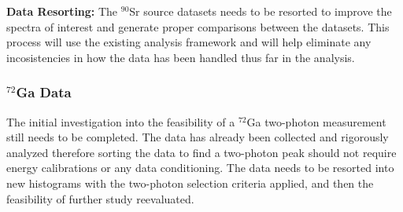 \documentclass[cnatzke_thesis_proposal.tex]{subfiles}
\begin{document}
\textbf{Data Resorting:} The $^{90}$Sr source datasets needs to be resorted to improve the spectra of interest and generate proper comparisons between the datasets. 
This process will use the existing analysis framework and will help eliminate any incosistencies in how the data has been handled thus far in the analysis. 

\subsubsection{$^{72}$Ga Data}
The initial investigation into the feasibility of a $^{72}$Ga two-photon measurement still needs to be completed. 
The data has already been collected and rigorously analyzed therefore sorting the data to find a two-photon peak should not require energy calibrations or any data conditioning.
The data needs to be resorted into new histograms with the two-photon selection criteria applied, and then the feasibility of further study reevaluated. 

\end{document}
